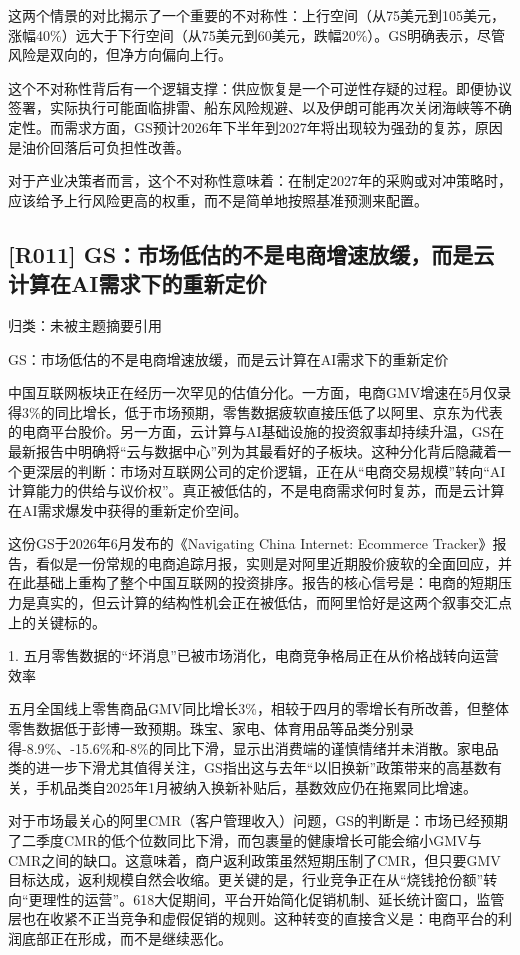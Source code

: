 \documentclass[11pt]{ctexart}
\begin{document}
这两个情景的对比揭示了一个重要的不对称性：上行空间（从75美元到105美元，涨幅40\%）远大于下行空间（从75美元到60美元，跌幅20\%）。GS明确表示，尽管风险是双向的，但净方向偏向上行。

这个不对称性背后有一个逻辑支撑：供应恢复是一个可逆性存疑的过程。即便协议签署，实际执行可能面临排雷、船东风险规避、以及伊朗可能再次关闭海峡等不确定性。而需求方面，GS预计2026年下半年到2027年将出现较为强劲的复苏，原因是油价回落后可负担性改善。

对于产业决策者而言，这个不对称性意味着：在制定2027年的采购或对冲策略时，应该给予上行风险更高的权重，而不是简单地按照基准预测来配置。

\subsection{[R011] GS：市场低估的不是电商增速放缓，而是云计算在AI需求下的重新定价}
{\small\color{refgray}归类：未被主题摘要引用}

GS：市场低估的不是电商增速放缓，而是云计算在AI需求下的重新定价

中国互联网板块正在经历一次罕见的估值分化。一方面，电商GMV增速在5月仅录得3\%的同比增长，低于市场预期，零售数据疲软直接压低了以阿里、京东为代表的电商平台股价。另一方面，云计算与AI基础设施的投资叙事却持续升温，GS在最新报告中明确将“云与数据中心”列为其最看好的子板块。这种分化背后隐藏着一个更深层的判断：市场对互联网公司的定价逻辑，正在从“电商交易规模”转向“AI计算能力的供给与议价权”。真正被低估的，不是电商需求何时复苏，而是云计算在AI需求爆发中获得的重新定价空间。

这份GS于2026年6月发布的《Navigating China Internet: Ecommerce Tracker》报告，看似是一份常规的电商追踪月报，实则是对阿里近期股价疲软的全面回应，并在此基础上重构了整个中国互联网的投资排序。报告的核心信号是：电商的短期压力是真实的，但云计算的结构性机会正在被低估，而阿里恰好是这两个叙事交汇点上的关键标的。

1. 五月零售数据的“坏消息”已被市场消化，电商竞争格局正在从价格战转向运营效率

五月全国线上零售商品GMV同比增长3\%，相较于四月的零增长有所改善，但整体零售数据低于彭博一致预期。珠宝、家电、体育用品等品类分别录得-8.9\%、-15.6\%和-8\%的同比下滑，显示出消费端的谨慎情绪并未消散。家电品类的进一步下滑尤其值得关注，GS指出这与去年“以旧换新”政策带来的高基数有关，手机品类自2025年1月被纳入换新补贴后，基数效应仍在拖累同比增速。

对于市场最关心的阿里CMR（客户管理收入）问题，GS的判断是：市场已经预期了二季度CMR的低个位数同比下滑，而包裹量的健康增长可能会缩小GMV与CMR之间的缺口。这意味着，商户返利政策虽然短期压制了CMR，但只要GMV目标达成，返利规模自然会收缩。更关键的是，行业竞争正在从“烧钱抢份额”转向“更理性的运营”。618大促期间，平台开始简化促销机制、延长统计窗口，监管层也在收紧不正当竞争和虚假促销的规则。这种转变的直接含义是：电商平台的利润底部正在形成，而不是继续恶化。
\end{document}
